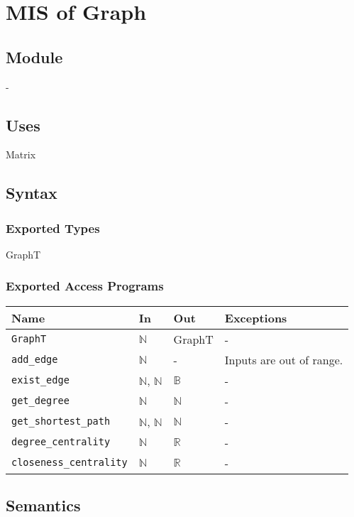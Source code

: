\documentclass[12pt, titlepage]{article}
\begin{document}
\section{MIS of Graph} \label{Module} 


\subsection{Module}
-

\subsection{Uses}
Matrix
\subsection{Syntax}

\subsubsection{Exported Types}
GraphT
\subsubsection{Exported Access Programs}
\begin{center}
\begin{tabular}{p{6cm} p{2cm} p{2cm} p{6cm}}
\hline
\textbf{Name} & \textbf{In} & \textbf{Out} & \textbf{Exceptions} \\
\hline
\texttt{GraphT} & ${\mathbb{N}}$  & GraphT& - \\
\texttt{add\_edge} & $\mathbb{N}$& -&Inputs are out of range. \\
\texttt{exist\_edge} & $\mathbb{N}$, $\mathbb{N}$ & $\mathbb{B}$  & - \\
\texttt{get\_degree} & $\mathbb{N}$ & $\mathbb{N}$ & - \\
\texttt{get\_shortest\_path} & $\mathbb{N}$, $\mathbb{N}$ & $\mathbb{N}$ & - \\
\texttt{degree\_centrality} & $\mathbb{N}$ & $\mathbb{R}$ & - \\
\texttt{closeness\_centrality} & $\mathbb{N}$ & $\mathbb{R}$ & - \\

\hline
\end{tabular}
\end{center}

\subsection{Semantics}
\end{document}
